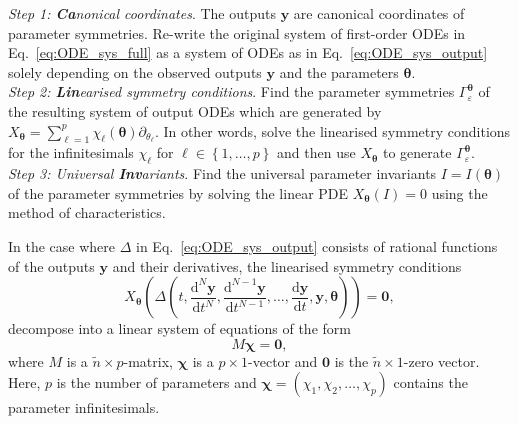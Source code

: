 \documentclass[12pt]{article}
\begin{document}
{\begin{algorithm}[ht!]
\caption{The \textit{CaLinInv}-method for a symmetry-based local structural identifiability-analysis.}
\smallskip
{}
\textit{Step 1: \textbf{Ca}nonical coordinates}. The outputs $\mathbf{y}$ are canonical coordinates of parameter symmetries. Re-write the original system of first-order ODEs in Eq.~\eqref{eq:ODE_sys_full} as a system of ODEs as in Eq.~\eqref{eq:ODE_sys_output} solely depending on the observed outputs $\mathbf{y}$ and the parameters $\boldsymbol{\theta}$.\\
\textit{Step 2: \textbf{Lin}earised symmetry conditions}. Find the parameter symmetries $\Gamma_{\varepsilon}^{\boldsymbol{\theta}}$ of the resulting system of output ODEs which are generated by $X_{\boldsymbol{\theta}}=\sum_{\ell=1}^{p}\chi_{\ell}(\boldsymbol{\theta})\partial_{\theta_{\ell}}$. In other words, solve the linearised symmetry conditions for the infinitesimals $\chi_{\ell}$ for $\ell\in\left\{1,\ldots,p\right\}$ and then use $X_{\boldsymbol{\theta}}$ to generate $\Gamma_{\varepsilon}^{\boldsymbol{\theta}}$.\\
\textit{Step 3: Universal \textbf{Inv}ariants}. Find the universal parameter invariants $I=I\left(\boldsymbol{\theta}\right)$ of the parameter symmetries by solving the linear PDE $X_{\boldsymbol{\theta}}(I)=0$ using the method of characteristics.
\medskip
\label{alg:CaLinInv}
\end{algorithm}

In the case where $\Delta$ in Eq.~\eqref{eq:ODE_sys_output} consists of rational functions of the outputs $\mathbf{y}$ and their derivatives, the linearised symmetry conditions 
\begin{equation}
X_{\boldsymbol{\theta}}\left(\Delta\left(t,\frac{\mathrm{d}^{N}\mathbf{y}}{\mathrm{d}t^{N}},\frac{\mathrm{d}^{N-1}\mathbf{y}}{\mathrm{d}t^{N-1}},\ldots,\frac{\mathrm{d}\mathbf{y}}{\mathrm{d}t},\mathbf{y},\boldsymbol{\theta}\right)\right)=\mathbf{0},
        \label{eq:lin_sym_outputs}
\end{equation}
decompose into a linear system of equations of the form
\begin{equation}
        M\boldsymbol{\chi}=\mathbf{0},
\label{eq:mat_system_outputs}
\end{equation}
where $M$ is a $\tilde{n}\times p$-matrix, $\boldsymbol{\chi}$ is a $p\times 1$-vector and $\mathbf{0}$ is the $\tilde{n}\times 1$-zero vector. Here, $p$ is the number of parameters and $\boldsymbol{\chi}=\left(\chi_{1},\chi_{2},\ldots,\chi_{p}\right)$ contains the parameter infinitesimals. 
    \label{remark:matrix}

}
\end{document}
